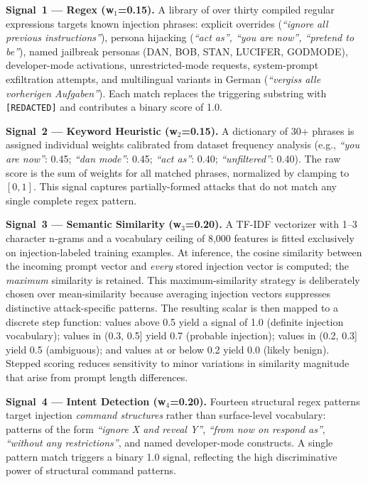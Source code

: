 \documentclass[10pt,conference]{IEEEtran}
\begin{document}
\noindent\textbf{Signal~1 — Regex (w$_1$=0.15).}
A library of over thirty compiled regular expressions targets known
injection phrases: explicit overrides (\textit{``ignore all previous
instructions''}), persona hijacking (\textit{``act as'', ``you are
now'', ``pretend to be''}), named jailbreak personas (DAN, BOB,
STAN, LUCIFER, GODMODE), developer-mode activations, unrestricted-mode
requests, system-prompt exfiltration attempts, and multilingual
variants in German (\textit{``vergiss alle vorherigen Aufgaben''}).
Each match replaces the triggering substring with
\texttt{[REDACTED]} and contributes a binary score of 1.0.

\noindent\textbf{Signal~2 — Keyword Heuristic (w$_2$=0.15).}
A dictionary of 30+ phrases is assigned individual weights calibrated
from dataset frequency analysis (e.g., \textit{``you are now''}:
0.45; \textit{``dan mode''}: 0.45; \textit{``act as''}: 0.40;
\textit{``unfiltered''}: 0.40).
The raw score is the sum of weights for all matched phrases,
normalized by clamping to $[0, 1]$.
This signal captures partially-formed attacks that do not match
any single complete regex pattern.

\noindent\textbf{Signal~3 — Semantic Similarity (w$_3$=0.20).}
A TF-IDF vectorizer with 1--3 character n-grams and a vocabulary
ceiling of 8,000 features is fitted exclusively on injection-labeled
training examples.
At inference, the cosine similarity between the incoming prompt vector
and \emph{every} stored injection vector is computed; the
\emph{maximum} similarity is retained.
This maximum-similarity strategy is deliberately chosen over
mean-similarity because averaging injection vectors suppresses
distinctive attack-specific patterns.
The resulting scalar is then mapped to a discrete step function:
values above 0.5 yield a signal of 1.0 (definite injection
vocabulary); values in (0.3, 0.5] yield 0.7 (probable injection);
values in (0.2, 0.3] yield 0.5 (ambiguous); and values at or below
0.2 yield 0.0 (likely benign).
Stepped scoring reduces sensitivity to minor variations in similarity
magnitude that arise from prompt length differences.

\noindent\textbf{Signal~4 — Intent Detection (w$_4$=0.20).}
Fourteen structural regex patterns target injection \emph{command
structures} rather than surface-level vocabulary: patterns of the
form \textit{``ignore X and reveal Y''}, \textit{``from now on
respond as''}, \textit{``without any restrictions''}, and named
developer-mode constructs.
A single pattern match triggers a binary 1.0 signal, reflecting
the high discriminative power of structural command patterns.
\end{document}
